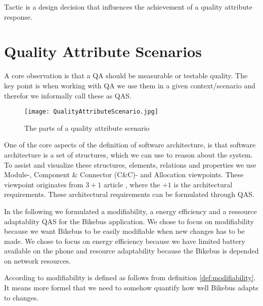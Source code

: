 \begin{defi}
Tactic is a design decision that influences the achievement of a quality attribute response. 
\end{defi}

\section{Quality Attribute Scenarios}

A core observation is that a QA should be measurable or testable quality. The key point is when working with QA we use them in a given context/scenario and therefor we informally call these as QAS.\\



\begin{figure}[H]
\centering
\texttt{[image: QualityAttributeScenario.jpg]}

\caption{The parts of a quality attribute scenario}
\label{fig:Quality_Attribute_Scenario}
\end{figure}






One of the core aspects of the definition of software architecture, is that software architecture is a set of structures, which we can use to reason about the system. To assist and visualize these structures, elements, relations and properties we use Module-, Component \& Connector (C\&C)- and Allocation viewpoints. These viewpoint originates from $3+1$ article \cite{3+1}, where the $+1$ is the architectural requirements. These architectural requirements can be formulated through QAS.


In the following we formulated a modifiability, a energy efficiency and a ressource adaptablity QAS for the Bikebus application. We chose to focus on modifiability because we want Bikebus to be easily modifiable when new changes has to be made. We chose to focus on energy efficiency because we have limited battery available on the phone and resource adaptability because the Bikebus is depended on network resources.

According to \cite{Bass} modifiability is defined as follows from definition \ref{def:modifiability}. It means more formel that we need to somehow quantify how well Bikebus adapts to changes.

